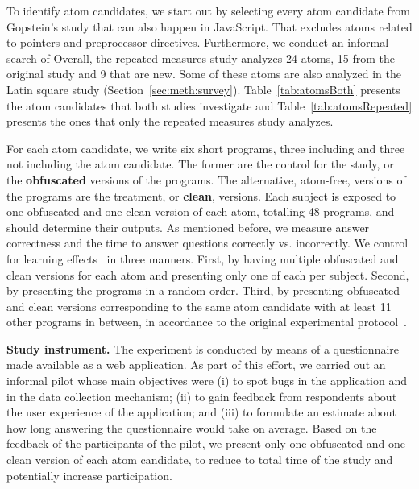 To identify atom candidates, we start out by selecting every atom candidate from Gopstein's study that can also happen in JavaScript. That excludes atoms related to pointers and preprocessor directives. Furthermore, we conduct an informal search of  Overall, the repeated measures study analyzes 24 atoms, 15 from the original study and 9 that are new. Some of these atoms are also analyzed in the Latin square study (Section~\ref{sec:meth:survey}). Table~\ref{tab:atomsBoth} presents the atom candidates that both studies investigate and Table~\ref{tab:atomsRepeated} presents the ones that only the repeated measures study analyzes. 



For each atom candidate, we write six short programs, three including and three not including the atom candidate. The former are the control for the study, or the \textbf{obfuscated} versions of the programs. The alternative, atom-free, versions of the programs are the treatment, or \textbf{clean}, versions. Each subject is exposed to one obfuscated and one clean version of each atom, totalling 48 programs, and should determine their outputs. As mentioned before, we measure answer correctness and the time to answer questions correctly vs. incorrectly. We control for learning effects~\cite{Neely:1991:SPE} in three manners. First, by having multiple obfuscated and clean versions for each atom and presenting only one of each per subject. Second, by presenting the programs in a random order. Third, by presenting obfuscated and clean versions corresponding to the same atom candidate with at least 11 other programs in between, in  accordance to the original experimental protocol~\cite{DBLP:conf/sigsoft/GopsteinIYDZYC17}. 


{\bf Study instrument.} The experiment is conducted by means of a questionnaire made available as a web application. As part of this effort, we carried out an informal pilot whose main objectives were (i) to spot bugs in the application and in the data collection mechanism; (ii) to gain feedback from respondents about the user experience of the application; and (iii) to formulate an estimate about how long answering the questionnaire would take on average. Based on the feedback of the participants of the pilot, we present only one obfuscated and one clean version of each atom candidate, to reduce to total time of the study and potentially increase participation.%

